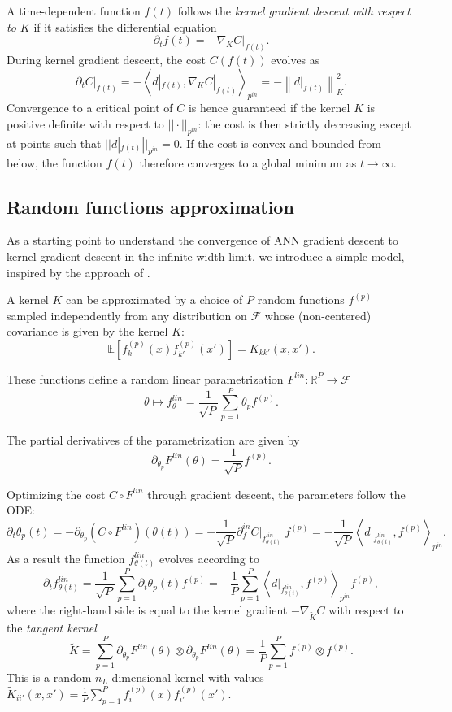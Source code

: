 \documentclass{article}
\begin{document}
A time-dependent function $ f (t) $ follows the \emph{kernel gradient descent with respect to $K$} if it satisfies the differential equation  
\[
	\partial_t f(t) = -\nabla_{K}C|_{f(t)}.
\] During kernel gradient descent, the cost $C(f(t))$ evolves as
\[
	\partial_t C|_{f(t)} = -\left<d|_{f(t)}, \nabla_{K}C|_{f(t)} \right>_{p^{in}}=-\left\|d|_{f(t)} \right\|_{K}^{2}.
\]
Convergence to a critical point of $C$ is hence guaranteed if the kernel $K$ is positive definite with respect to $|| \cdot ||_{p^{in}}$: the cost is then strictly decreasing except at points such that $||d|_{f(t)}||_{p^{in}} = 0$. If the cost is convex and bounded from below, the function $f(t)$ therefore converges to a global minimum as $t \to \infty$.

\subsection{Random functions approximation} \label{sec:rfa}
As a starting point to understand the convergence of ANN gradient descent to kernel gradient descent in the infinite-width limit, we introduce a simple model, inspired by the approach of \cite{Rahimi2007}. 

A kernel $K$ can be approximated by a choice of $P$ random functions $f^{(p)}$ sampled independently from any distribution on $\mathcal{F}$ whose (non-centered) covariance is given by the kernel $K$:
\[
\mathbb{E}[f_{k}^{(p)}(x)f_{k'}^{(p)}(x')]=K_{kk'}(x,x').
\]

These functions define a random linear parametrization $F^{lin}:\mathbb{R}^{P}\to\mathcal{F}$
\[
\theta \mapsto f_{\theta}^{lin}=\frac{1}{\sqrt{P}}\sum_{p=1}^{P}\theta_{p}f^{(p)}.
\]

The partial derivatives of the parametrization are given by 
\[
	\partial_{\theta_p} F^{lin}(\theta) = \frac{1}{\sqrt{P}} f^{(p)}.
\] 

Optimizing the cost $C\circ F^{lin}$ through gradient descent, the parameters follow the ODE:
\[
\partial_t  \theta_{p}(t)=-\partial_{\theta_{p}}(C\circ F^{lin})(\theta(t))=-\frac{1}{\sqrt{P}}\partial_{f}^{in}C|_{f_{\theta(t)}^{lin}}\;f^{(p)}=-\frac{1}{\sqrt{P}} \left<d|_{f_{\theta(t)}^{lin}}, f^{(p)}\right>_{p^{in}}.
\]
As a result the function $f_{\theta(t)}^{lin}$ evolves according to
\[
\partial_t f_{\theta(t)}^{lin}=\frac{1}{\sqrt{P}}\sum_{p=1}^{P} \partial_t \theta_{p}(t)f^{(p)}=-\frac{1}{P}\sum_{p=1}^{P}\left<d|_{f_{\theta(t)}^{lin}}, f^{(p)}\right>_{p^{in}} f^{(p)},
\]
where the right-hand side is equal to the kernel gradient $-\nabla_{\tilde{K}} C$ with respect to the \emph{tangent kernel} 
$$
\tilde{K} =\sum_{p=1}^P \partial_{\theta_p} F^{lin}(\theta) \otimes  \partial_{\theta_p} F^{lin}(\theta) = \frac{1}{P}\sum_{p=1}^P f^{(p)} \otimes f^{(p)}.
$$ 
This is a random $n_L$-dimensional kernel with values
$
\tilde{K}_{ii'}(x, x') = \frac{1}{P} \sum_{p=1}^P  f^{(p)}_i(x) f^{(p)}_{i'}(x').
$
\end{document}
